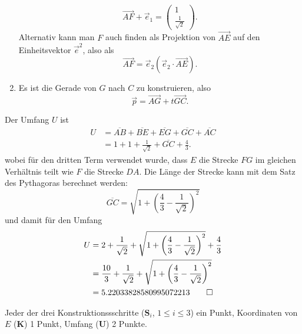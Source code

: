 \begin{loesung}
\begin{teilaufgaben}
\begin{enumerate}
\[\overrightarrow{AF}+\vec{e}_1
=
\begin{pmatrix}1\\\frac1{\sqrt{2}}\end{pmatrix}.
\]
Alternativ kann man $F$ auch finden als Projektion von $\overrightarrow{AE}$
auf den Einheitsvektor $\vec e^2$, also als
\[
\overrightarrow{AF} = \vec{e}_2 (\vec{e}_2\cdot \overrightarrow{AE}).
\]
\item Es ist die Gerade von $G$ nach $C$ zu konstruieren, also
\[
\vec p = \overrightarrow{AG}+t\overrightarrow{GC}.
\]
\end{enumerate}
\item
Der Umfang $U$ ist
\begin{align*}
U
&=
\overline{AB} + \overline{BE} + \overline{EG} + \overline{GC} +\overline{AC}
\\
&=
1 + 1 + \frac1{\sqrt{2}}+\overline{GC} + \frac43.
\end{align*}
wobei für den dritten Term verwendet wurde, dass $E$ die Strecke
$FG$ im gleichen Verhältnis teilt wie $F$ die Strecke $DA$.
Die Länge der Strecke kann mit dem Satz des Pythagoras berechnet
werden:
\[
\overline{GC}
=
\sqrt{1+\left(\frac43-\frac1{\sqrt{2}}\right)^2}
\]
und damit für den Umfang
\begin{align*}
U
&=
 2
+ \frac1{\sqrt{2}}
+ \sqrt{1+\left(\frac43-\frac1{\sqrt{2}}\right)^2}
+ \frac43
\\
&=
\frac{10}{3}
+ \frac1{\sqrt{2}}
+ \sqrt{1+\left(\frac43-\frac1{\sqrt{2}}\right)^2}
\\
&=
5.22033828580995072213
\qedhere
\end{align*}
\end{teilaufgaben}
\end{loesung}

\begin{bewertung}
Jeder der drei Konstruktionssschritte ($\textbf{S}_i$, $1\le i\le 3$) ein Punkt,
Koordinaten von $E$ ({\bf K}) 1 Punkt,
Umfang ({\bf U}) 2 Punkte.
\end{bewertung}

